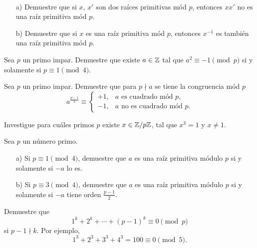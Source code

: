 \documentclass{article}
\begin{document}
\begin{problema}
  ~

  \begin{enumerate}
  \item[a)] Demuestre que si $x$, $x'$ son dos raíces primitivas mód $p$,
    entonces $x x'$ no es una raíz primitiva mód $p$.

  \item[b)] Demuestre que si $x$ es una raíz primitiva mód $p$, entonces
    $x^{-1}$ es también una raíz primitiva mód $p$.
  \end{enumerate}
\end{problema}

\begin{problema}
  Sea $p$ un primo impar. Demuestre que existe $a \in \mathbb{Z}$ tal que
  $a^2 \equiv -1 \pmod{p}$ si y solamente si $p \equiv 1 \pmod{4}$.
\end{problema}

\begin{problema}[Euler]
  Sea $p$ un primo impar. Demuestre que para $p \nmid a$ se tiene
  la congruencia mód $p$
  \[ a^{\frac{p-1}{2}} \equiv
    \begin{cases}
      +1, & a \text{ es cuadrado mód }p, \\
      -1, & a \text{ no es cuadrado mód }p.
    \end{cases} \]
\end{problema}

\begin{problema}
  Investigue para cuáles primos $p$ existe $x \in \mathbb{Z}/p\mathbb{Z}$, tal que $x^3 = 1$ y
  $x \ne 1$.
\end{problema}

\begin{problema}
  Sea $p$ un número primo.

  \begin{enumerate}
  \item[a)] Si $p \equiv 1 \pmod{4}$, demuestre que $a$ es una raíz primitiva
    módulo $p$ si y solamente si $-a$ lo es.

  \item[b)] Si $p \equiv 3 \pmod{4}$, demuestre que $a$ es una raíz primitiva
    módulo $p$ si y solamente si $-a$ tiene orden $\frac{p-1}{2}$.
  \end{enumerate}
\end{problema}

\begin{problema}
  Demuestre que
  $$1^k + 2^k + \cdots + (p-1)^k \equiv 0 \pmod{p}$$
  si $p-1 \nmid k$. Por ejemplo,
  $$1^3 + 2^3 + 3^3 + 4^3 = 100 \equiv 0 \pmod{5}.$$
\end{problema}
\end{document}
